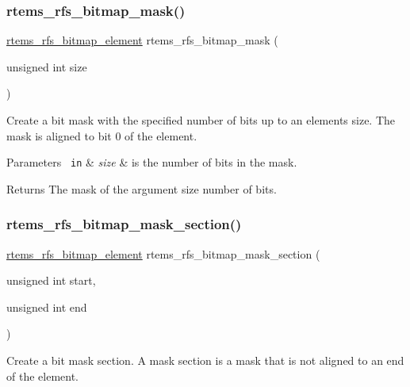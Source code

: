 \subsubsection{\texorpdfstring{rtems\_rfs\_bitmap\_mask()}{rtems\_rfs\_bitmap\_mask()}}
{\footnotesize\ttfamily \mbox{\hyperlink{rtems-rfs-bitmaps_8h_a2e909e0a0c9759ac71ca69851253b905}{rtems\+\_\+rfs\+\_\+bitmap\+\_\+element}} rtems\+\_\+rfs\+\_\+bitmap\+\_\+mask (\begin{DoxyParamCaption}\item[{unsigned int}]{size }\end{DoxyParamCaption})}

Create a bit mask with the specified number of bits up to an element\textquotesingle{}s size. The mask is aligned to bit 0 of the element.


\begin{DoxyParams}[1]{Parameters}
\mbox{\texttt{ in}}  & {\em size} & is the number of bits in the mask.\\
\hline
\end{DoxyParams}
\begin{DoxyReturn}{Returns}
The mask of the argument size number of bits. 
\end{DoxyReturn}
\mbox{\label{rtems-rfs-bitmaps_8h_ab7bd24e753558028374d00c06c99ded1}} 
\subsubsection{\texorpdfstring{rtems\_rfs\_bitmap\_mask\_section()}{rtems\_rfs\_bitmap\_mask\_section()}}
{\footnotesize\ttfamily \mbox{\hyperlink{rtems-rfs-bitmaps_8h_a2e909e0a0c9759ac71ca69851253b905}{rtems\+\_\+rfs\+\_\+bitmap\+\_\+element}} rtems\+\_\+rfs\+\_\+bitmap\+\_\+mask\+\_\+section (\begin{DoxyParamCaption}\item[{unsigned int}]{start,  }\item[{unsigned int}]{end }\end{DoxyParamCaption})}

Create a bit mask section. A mask section is a mask that is not aligned to an end of the element.


